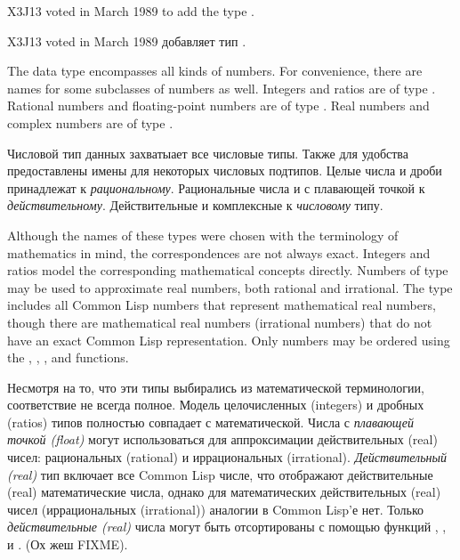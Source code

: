 \begin{newer}
X3J13 voted in March 1989  to add the type .

X3J13 voted in March 1989  добавляет тип .

The  data type encompasses all kinds of
             numbers.  For convenience, there are names for some
             subclasses of numbers as well.  Integers and ratios are of
             type .  Rational numbers and floating-point
             numbers are of type .  Real numbers and complex
             numbers are of type .

Числовой тип данных захватыает все числовые типы. Также для
удобства предоставлены имены для некоторых числовых
подтипов. Целые числа и дроби принадлежат к
{\it рациональному}. Рациональные числа и с плавающей точкой к
{\it действительному}. Действительные и комплексные к {\it числовому} типу.

             Although the names of these types were chosen with the
             terminology of mathematics in mind, the correspondences
             are not always exact.  Integers and ratios model the
             corresponding mathematical concepts directly.  Numbers
             of type  may be used to approximate real
             numbers, both rational and irrational.  The  type
             includes all Common Lisp numbers that represent
             mathematical real numbers, though there are
             mathematical real numbers (irrational numbers)
             that do not have an exact Common Lisp representation.
             Only  numbers may be ordered using the \cd{<}, \cd{>}, \cd{<=},
             and \cd{>=} functions.

Несмотря на то, что эти типы выбирались из математической
терминологии, соответствие не всегда полное. Модель целочисленных
(integers) и дробных (ratios) типов полностью совпадает с
математической. Числа с {\it плавающей точкой (float)} могут
использоваться для аппроксимации действительных (real) чисел:
рациональных (rational) и иррациональных
(irrational). {\it Действительный (real)} тип включает все Common Lisp
числе, что отображают действительные (real) математические числа,
однако для математических действительных (real) чисел
(иррациональных (irrational)) аналогии в Cоmmon Lisp'е нет. Только
{\it действительные (real)} числа могут быть отсортированы с помощью
функций \cd{<}, \cd{>}, \cd{<=} и \cd{>=}. (Ох жеш FIXME). 


\end{newer}
